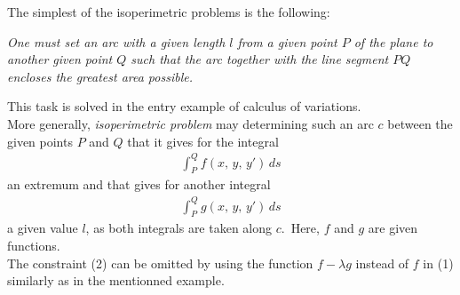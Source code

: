 \documentclass[12pt]{article}
\theoremstyle{definition}
\begin{document}
The simplest of the isoperimetric problems is the following:

\emph{One must set an arc with a given length $l$ from a given point $P$ of the plane to another given point $Q$ such that the arc together with the line segment $PQ$ encloses the greatest area possible.}

This task is solved in the entry example of calculus of variations.\\


More generally, \emph{isoperimetric problem} may  determining such an arc $c$ between the given points $P$ and $Q$ that it gives for the integral
\begin{align}
\int_P^Q\!f(x,\,y,\,y')\,ds
\end{align}
an extremum and that gives for another integral
\begin{align}
\int_P^Q\!g(x,\,y,\,y')\,ds
\end{align}
a given value $l$, as both integrals are taken along $c$.\, Here, $f$ and $g$ are given functions.\\


The constraint (2) can be omitted by using the function $f\!-\!\lambda g$ instead of $f$ in (1) similarly as in the mentionned example. 

\end{document}
